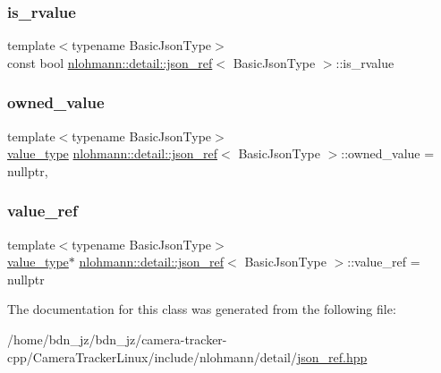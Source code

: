 \subsubsection{\texorpdfstring{is\+\_\+rvalue}{is\_rvalue}}
{\footnotesize\ttfamily template$<$typename Basic\+Json\+Type$>$ \\
const bool \hyperlink{classnlohmann_1_1detail_1_1json__ref}{nlohmann\+::detail\+::json\+\_\+ref}$<$ Basic\+Json\+Type $>$\+::is\+\_\+rvalue\hspace{0.3cm}{\ttfamily [private]}}

\mbox{\label{classnlohmann_1_1detail_1_1json__ref_a5d7bd67a5ab713d9be1e248cf9d509cd}} 
\subsubsection{\texorpdfstring{owned\+\_\+value}{owned\_value}}
{\footnotesize\ttfamily template$<$typename Basic\+Json\+Type$>$ \\
\hyperlink{classnlohmann_1_1detail_1_1json__ref_a78d76cf288141049568c0d670ed670ef}{value\+\_\+type} \hyperlink{classnlohmann_1_1detail_1_1json__ref}{nlohmann\+::detail\+::json\+\_\+ref}$<$ Basic\+Json\+Type $>$\+::owned\+\_\+value = nullptr\hspace{0.3cm}{\ttfamily [mutable]}, {\ttfamily [private]}}

\mbox{\label{classnlohmann_1_1detail_1_1json__ref_a23504615c2076070d5e087443bb376a4}} 
\subsubsection{\texorpdfstring{value\+\_\+ref}{value\_ref}}
{\footnotesize\ttfamily template$<$typename Basic\+Json\+Type$>$ \\
\hyperlink{classnlohmann_1_1detail_1_1json__ref_a78d76cf288141049568c0d670ed670ef}{value\+\_\+type}$\ast$ \hyperlink{classnlohmann_1_1detail_1_1json__ref}{nlohmann\+::detail\+::json\+\_\+ref}$<$ Basic\+Json\+Type $>$\+::value\+\_\+ref = nullptr\hspace{0.3cm}{\ttfamily [private]}}



The documentation for this class was generated from the following file\+:\begin{DoxyCompactItemize}
\item 
/home/bdn\+\_\+jz/bdn\+\_\+jz/camera-\/tracker-\/cpp/\+Camera\+Tracker\+Linux/include/nlohmann/detail/\hyperlink{json__ref_8hpp}{json\+\_\+ref.\+hpp}\end{DoxyCompactItemize}
